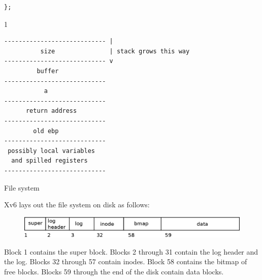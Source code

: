 \documentclass[11pt]{exam}
\def\answers{1}
\begin{document}
\begin{questions}
\begin{parts}
\begin{verbatim}
}; 
\end{verbatim} 


\if\answers1
\begin{verbatim}
---------------------------- |
          size               | stack grows this way
---------------------------- v
         buffer 
----------------------------
           a 
----------------------------
      return address
----------------------------
        old ebp 
----------------------------
 possibly local variables 
  and spilled registers 
----------------------------
\end{verbatim} 
\fi

\vfill 

\iffalse

\part[5] Buffer overflow is an attack that redirects control flow ... 


\if\answers1
\fi

\vfill 

\fi


\end{parts}

\newpage

\addpoints \question File system


Xv6 lays out the file system on disk as follows:

\begin{figure}[h] \centering
  \includegraphics[width=0.8\columnwidth]{figs/fs}
  \label{fig:ramengine-decomposed-app}

\end{figure}

Block 1 contains the super block. Blocks 2 through 31 contain the log header
and the log. Blocks 32 through 57 contain inodes. Block 58 contains the bitmap
of free blocks. Blocks 59 through the end of the disk contain data blocks. 

 
\end{questions}
\end{document}
